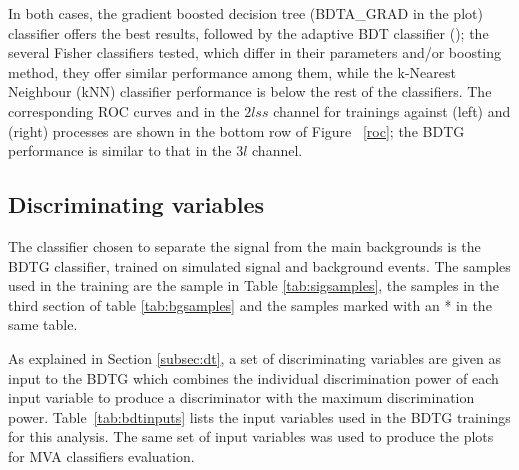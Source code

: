 In both cases, the gradient boosted decision tree  (BDTA\_GRAD in the plot) classifier offers the best results, followed by the adaptive BDT classifier (); the several Fisher classifiers tested, which differ in their parameters and/or boosting method, they offer similar performance among them, while the k-Nearest Neighbour (kNN) classifier performance is below the rest of the classifiers. The corresponding ROC curves and in the $2lss$ channel for trainings against \ttV (left) and \ttbar (right) processes are shown in the bottom row of Figure ~\ref{roc}; the BDTG performance is similar to that in the $3l$ channel.

\subsection{Discriminating variables}

The classifier chosen to separate the \tHq signal from the main backgrounds is the BDTG classifier, trained on simulated signal and background events. The samples used in the training are the \tHq sample in Table \ref{tab:sigsamples}, the samples in the third section of table \ref{tab:bgsamples} and the samples marked with an * in the same table.

As explained in Section \ref{subsec:dt}, a set of discriminating variables are given as input to the BDTG which combines the individual discrimination power of each input variable to produce a discriminator with the maximum discrimination power. Table~\ref{tab:bdtinputs} lists the input variables used in the BDTG trainings for this analysis. The same set of input variables was used to produce the plots for MVA classifiers evaluation. 

